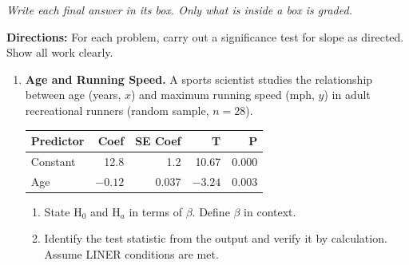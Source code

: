 \documentclass[10pt]{article}
\begin{document}
{\small\itshape Write each final answer in its box. Only what is inside a box is graded.}\par

\vspace{0.1in}
\textbf{Directions:} For each problem, carry out a significance test for slope as directed.
Show all work clearly.

\begin{enumerate}

  \boxguard[15]
  \item \textbf{Age and Running Speed.} A sports scientist studies the relationship between
        age (years, $x$) and maximum running speed (mph, $y$) in adult recreational runners
        (random sample, $n = 28$).

        \begin{center}
        \renewcommand{\arraystretch}{1.4}
        \begin{tabular}{lrrrr}
            \textbf{Predictor} & \textbf{Coef} & \textbf{SE Coef} & \textbf{T} & \textbf{P} \\
            \hline
            Constant & 12.8 & 1.2   & 10.67 & 0.000 \\
            Age      & $-0.12$ & 0.037 & $-3.24$ & 0.003 \\
        \end{tabular}
        \end{center}

        \begin{enumerate}[label=\alph*.]
          \boxguard[15]
          \item State H$_0$ and H$_a$ in terms of $\beta$. Define $\beta$ in context.


          \boxguard[15]
          \item Identify the test statistic from the output and verify it by calculation.
                Assume LINER conditions are met.


\end{enumerate}
\end{enumerate}
\end{document}
